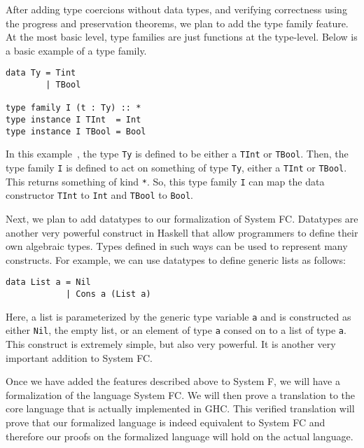\documentclass{sig-alternate}
\begin{document}
After adding type coercions without data types, and verifying correctness using the progress and preservation theorems, we plan to add the type family feature. At the most basic level, type families are just functions at the type-level. Below is a basic example of a type family.
\begin{verbatim}
data Ty = Tint
        | TBool

type family I (t : Ty) :: *
type instance I TInt  = Int
type instance I TBool = Bool
\end{verbatim}
In this example~\cite{DBLP:conf/icfp/WeirichHE13}, the type \texttt{Ty} is defined to be either a \texttt{TInt} or \texttt{TBool}. Then, the type family \texttt{I} is defined to act on something of type \texttt{Ty}, either a \texttt{TInt} or \texttt{TBool}. This returns something of kind \texttt{*}. So, this type family \texttt{I} can map the data constructor \texttt{TInt} to \texttt{Int} and \texttt{TBool} to \texttt{Bool}.

Next, we plan to add datatypes to our formalization of System FC. Datatypes are another very powerful construct in Haskell that allow programmers to define their own algebraic types. Types defined in such ways can be used to represent many constructs. For example, we can use datatypes to define generic lists as follows:
\begin{verbatim}
data List a = Nil
            | Cons a (List a)
\end{verbatim}
Here, a list is parameterized by the generic type variable \texttt{a} and is constructed as either \texttt{Nil}, the empty list, or an element of type \texttt{a} consed on to a list of type \texttt{a}.  This construct is extremely simple, but also very powerful.  It is another very important addition to System FC.

Once we have added the features described above to System F, we will have a formalization of the language System FC.  We will then prove a translation to the core language that is actually implemented in GHC.  This verified translation will prove that our formalized language is indeed equivalent to System FC and therefore our proofs on the formalized language will hold on the actual language.
\end{document}
